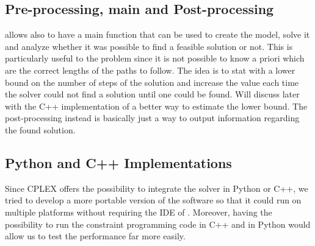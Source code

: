 \subsection{Pre-processing, main and Post-processing}
\OPL allows also to have a main function that can be used to create the model,
solve it and analyze whether it was possible to find a feasible solution or
not. This is particularly useful to the  problem since it is not
possible to know a priori which are the correct lengths of the paths to follow.
The idea is to stat with a lower bound on the number of steps of the solution
and increase the value each time the solver could not find a solution until one
could be found. Will discuss later with the C++ implementation of a better way
to estimate the lower bound. \newline
The post-processing instead is basically just a way to output information
regarding the found solution. 
%
%
\subsection{Python and C++ Implementations}
Since CPLEX offers the possibility to integrate the solver in Python or C++, we
tried to develop a more portable version of the software so that it could run
on multiple platforms without requiring the IDE of \OPL. Moreover, having the
possibility to run the constraint programming code in C++ and in Python would
allow us to test the performance far more easily. 
